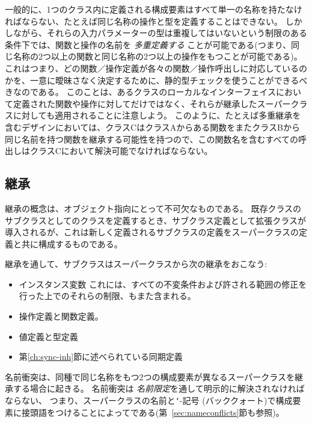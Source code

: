 \documentclass[\pformat,12pt]{jarticle}
\newcommand{\vppsmall}{\small\tt}
\begin{document}
\begin{description}
一般的に、1つのクラス内に定義される構成要素はすべて単一の名称を持たなければならない、たとえば同じ名称の操作と型を定義することはできない。
 しかしながら、それらの入力パラメーターの型は重複してはいないという制限のある条件下では、関数と操作の名前を {\it 多重定義する} ことが可能である(つまり、同じ名称の2つ以上の関数と同じ名称の2つ以上の操作をもつことが可能である)。
これはつまり、どの関数／操作定義が各々の関数／操作呼出しに対応しているのかを、一意に曖昧さなく決定するために、静的型チェックを使うことができるべきなのである。
このことは、あるクラスのローカルなインターフェイスにおいて定義された関数や操作に対してだけではなく、それらが継承したスーパークラスに対しても適用されることに注意しよう。
このように、たとえば多重継承を含むデザインにおいては、クラスCはクラスAからある関数をまたクラスBから同じ名前を持つ関数を継承する可能性を持つので、この関数名を含むすべての呼出しはクラスCにおいて解決可能でなければならない。 
\end{description}

\subsection{継承}\label{ch:inherit}

継承の概念は、オブジェクト指向にとって不可欠なものである。
既存クラスのサブクラスとしてのクラスを定義するとき、サブクラス定義として拡張クラスが導入されるが、これは新しく定義されるサブクラスの定義をスーパークラスの定義と共に構成するものである。

継承を通して、サブクラスはスーパークラスから次の継承をおこなう:
\begin{itemize}
\item インスタンス変数 %
これには、すべての不変条件および許される範囲の修正を行った上でのそれらの制限、もまた含まれる。
\item 操作定義と関数定義。
\item 値定義と型定義
\item 第\ref{ch:sync-inh}節に述べられている同期定義
\end{itemize}

名前衝突は、同種で同じ名称をもつ2つの構成要素が異なるスーパークラスを継承する場合に起きる。
名前衝突は {\it 名前限定}を通して明示的に解決されなければならない、
つまり、スーパークラスの名前と{\vppsmall `}-記号 (バッククォート)で構成要素に接頭語をつけることによってである(第~\ref{sec:nameconflicts}節も参照)。
\end{document}
